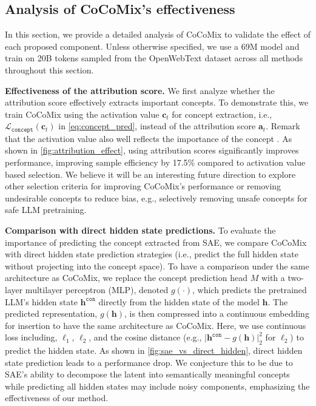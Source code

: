 \documentclass[]{fairmeta}
\def\rva{{\mathbf{a}}}
\def\rvc{{\mathbf{c}}}
\def\rvh{{\mathbf{h}}}
\newcommand{\sname}{CoCoMix\xspace}
\begin{document}
\subsection{Analysis of  \sname's effectiveness }
\label{sec:analysis}

In this section, we provide a detailed analysis of \sname to validate the effect of each proposed component. Unless otherwise specified, we use a 69M model and train on 20B tokens sampled from the OpenWebText dataset across all methods throughout this section.

\textbf{Effectiveness of the attribution score.} We first analyze whether the attribution score effectively extracts important concepts. To demonstrate this, we train \sname using the activation value $\rvc_t$ for concept extraction, i.e., $\mathcal{L}_{\mathtt{concept}}(\rvc_t)$ in \autoref{eq:concept_pred}, instead of the attribution score $\rva_t$. Remark that the activation value also well reflects the importance of the concept \citep{bricken2023monosemanticity}. As shown in \autoref{fig:attribution_effect}, using attribution scores significantly improves performance, improving sample efficiency by 17.5\% compared to activation value based selection. We believe it will be an interesting future direction to explore other selection criteria for improving \sname's performance or removing undesirable concepts to reduce bias, e.g., selectively removing unsafe concepts for safe LLM pretraining.

\textbf{Comparison with direct hidden state predictions.} To evaluate the importance of predicting the concept extracted from SAE, we compare \sname with direct hidden state prediction strategies (i.e., predict the full hidden state without projecting into the concept space). To have a comparison under the same architecture as \sname, we replace the concept prediction head $M$ with a two-layer multilayer perceptron (MLP), denoted $g(\cdot)$, which predicts the pretrained LLM's hidden state $\rvh^{\mathtt{con}}$ directly from the hidden state of the model $\rvh$. The predicted representation, $g(\rvh)$, is then compressed into a continuous embedding for insertion to have the same architecture as \sname. Here, we use continuous loss including, $\ell_1$, $\ell_2$, and the cosine distance (e.g., $\lvert \rvh^{\mathtt{con}} - g(\rvh) \rvert_2^2$ for $\ell_2$) to predict the hidden state. As shown in \autoref{fig:sae_vs_direct_hidden}, direct hidden state prediction leads to a performance drop. We conjecture this to be due to SAE's ability to decompose the latent into semantically meaningful concepts while predicting all hidden states may include noisy components, emphasizing the effectiveness of our method.
\end{document}
